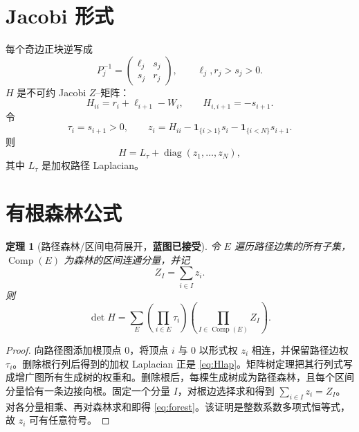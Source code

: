 \documentclass[UTF8,12pt,openany,fontset=fandol]{ctexrep}
\newtheorem{theorem}{定理}[chapter]
\theoremstyle{definition}
\newcommand{\diag}{\operatorname{diag}}
\newcommand{\Trusted}{\textcolor{green!45!black}{\textbf{蓝图已接受}}}
\begin{document}
\section{Jacobi 形式}

每个奇边正块逆写成
\begin{equation}
 P_j^{-1}=\begin{pmatrix}\ell_j&s_j\\s_j&r_j\end{pmatrix},\qquad
 \ell_j,r_j>s_j>0.
\end{equation}
$H$ 是不可约 Jacobi $Z$--矩阵：
\begin{equation}
 H_{ii}=r_i+\ell_{i+1}-W_i,\qquad H_{i,i+1}=-s_{i+1}.
\end{equation}
令
\begin{equation}
 \tau_i=s_{i+1}>0,\qquad
 z_i=H_{ii}-\mathbf 1_{\{i>1\}}s_i-\mathbf 1_{\{i<N\}}s_{i+1}.
\end{equation}
则
\begin{equation}\label{eq:Hlap}
 H=L_\tau+\diag(z_1,\ldots,z_N),
\end{equation}
其中 $L_\tau$ 是加权路径 Laplacian。

\section{有根森林公式}

\begin{theorem}[路径森林/区间电荷展开，\Trusted]\label{thm:forest}
令 $E$ 遍历路径边集的所有子集，$\operatorname{Comp}(E)$ 为森林的区间连通分量，并记
\begin{equation}
 Z_I=\sum_{i\in I}z_i.
\end{equation}
则
\begin{equation}\label{eq:forest}
 \det H=\sum_E\left(\prod_{i\in E}\tau_i\right)
                \left(\prod_{I\in\operatorname{Comp}(E)}Z_I\right).
\end{equation}
\end{theorem}

\begin{proof}
向路径图添加根顶点 $0$，将顶点 $i$ 与 $0$ 以形式权 $z_i$ 相连，并保留路径边权 $\tau_i$。删除根行列后得到的加权 Laplacian 正是 \eqref{eq:Hlap}。矩阵树定理把其行列式写成增广图所有生成树的权重和。删除根后，每棵生成树成为路径森林，且每个区间分量恰有一条边接向根。固定一个分量 $I$，对根边选择求和得到 $\sum_{i\in I}z_i=Z_I$。对各分量相乘、再对森林求和即得 \eqref{eq:forest}。该证明是整数系数多项式恒等式，故 $z_i$ 可有任意符号。
\end{proof}
\end{document}
